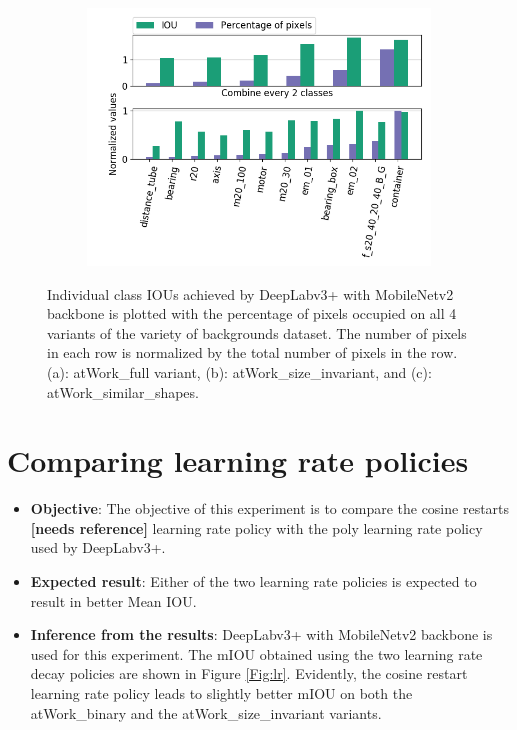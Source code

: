 \begin{figure}
\begin{subfigure}{.5\textwidth}
				\includegraphics[width=1\linewidth]{images/cls_iou_shape}
				\caption{}
				\label{Fig:clsiouc}
			\end{subfigure}
			\caption{Individual class IOUs achieved by DeepLabv3+ with MobileNetv2 backbone is plotted with the percentage of pixels occupied on all 4 variants of the variety of backgrounds dataset. The number of pixels in each row is normalized by the total number of pixels in the row. (a): atWork\_full variant, (b): atWork\_size\_invariant, and (c): atWork\_similar\_shapes.}
			\label{Fig:clsiou}
		\end{figure}

\section{Comparing learning rate policies}
	
	\begin{itemize}
		\item \textbf{Objective}: The objective of this experiment is to compare the cosine restarts \textbf{[needs reference]} learning rate policy with the poly learning rate policy used by DeepLabv3+.
		\item \textbf{Expected result}: Either of the two learning rate policies is expected to result in better Mean IOU.
		\item \textbf{Inference from the results}: DeepLabv3+ with MobileNetv2 backbone is used for this experiment. The mIOU obtained using the two learning rate decay policies are shown in Figure \ref{Fig:lr}. Evidently, the cosine restart learning rate policy leads to slightly better mIOU on both the atWork\_binary and the atWork\_size\_invariant variants.
	\end{itemize}
	
